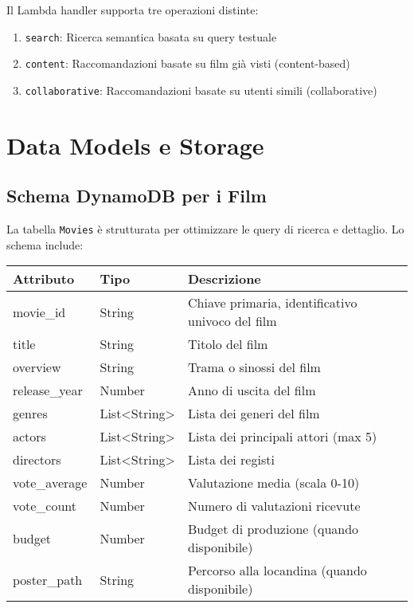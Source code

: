 \documentclass[11pt,a4paper]{article}
\begin{document}
Il Lambda handler supporta tre operazioni distinte:

\begin{enumerate}
  \item \texttt{search}: Ricerca semantica basata su query testuale
  \item \texttt{content}: Raccomandazioni basate su film già visti (content-based)
  \item \texttt{collaborative}: Raccomandazioni basate su utenti simili (collaborative)
\end{enumerate}

\section{Data Models e Storage}
\subsection{Schema DynamoDB per i Film}
La tabella \texttt{Movies} è strutturata per ottimizzare le query di ricerca e dettaglio. Lo schema include:

\begin{center}
\begin{tabular}{lll}
\toprule
\textbf{Attributo} & \textbf{Tipo} & \textbf{Descrizione} \\
\midrule
movie\_id & String & Chiave primaria, identificativo univoco del film \\
title & String & Titolo del film \\
overview & String & Trama o sinossi del film \\
release\_year & Number & Anno di uscita del film \\
genres & List<String> & Lista dei generi del film \\
actors & List<String> & Lista dei principali attori (max 5) \\
directors & List<String> & Lista dei registi \\
vote\_average & Number & Valutazione media (scala 0-10) \\
vote\_count & Number & Numero di valutazioni ricevute \\
budget & Number & Budget di produzione (quando disponibile) \\
poster\_path & String & Percorso alla locandina (quando disponibile) \\
\bottomrule
\end{tabular}
\end{center}
\end{document}
